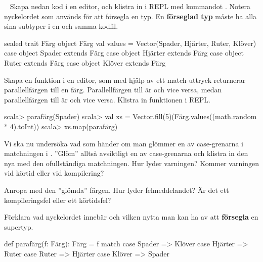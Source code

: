 \QUESTEND








\QUESTBEGIN

\Task  \what~  Skapa nedan kod i en editor, och klistra in i REPL med kommandot . Notera nyckelordet  som används för att försegla en typ. En \textbf{förseglad typ} måste ha alla sina subtyper i en och samma kodfil.
\begin{Code}
sealed trait Färg
object Färg {
  val values = Vector(Spader, Hjärter, Ruter, Klöver)
}
case object Spader  extends Färg
case object Hjärter extends Färg
case object Ruter   extends Färg
case object Klöver  extends Färg
\end{Code}

\Subtask Skapa en funktion  i en editor, som med hjälp av ett match-uttryck returnerar parallellfärgen till en färg. Parallellfärgen till  är  och vice versa, medan parallellfärgen till  är  och vice versa. Klistra in funktionen i REPL.
\begin{REPL}
scala> parafärg(Spader)
scala> val xs = Vector.fill(5)(Färg.values((math.random * 4).toInt))
scala> xs.map(parafärg)
\end{REPL}

\Subtask Vi ska nu undersöka vad som händer om man glömmer en av case-grenarna i matchningen i . ''Glöm'' alltså avsiktligt en av case-grenarna och klistra in den nya  med den ofullständiga matchningen. Hur lyder varningen? Kommer varningen vid körtid eller vid kompilering?

\Subtask Anropa  med den ''glömda'' färgen. Hur lyder felmeddelandet? Är det ett kompileringsfel eller ett körtidsfel?

\Subtask Förklara vad nyckelordet  innebär och vilken nytta man kan ha av att \textbf{försegla} en supertyp.


\SOLUTION


\TaskSolved \what


\SubtaskSolved
\begin{Code}
def parafärg(f: Färg): Färg = f match {
  case Spader  => Klöver
  case Hjärter => Ruter
  case Ruter   => Hjärter
  case Klöver  => Spader
}
\end{Code}

